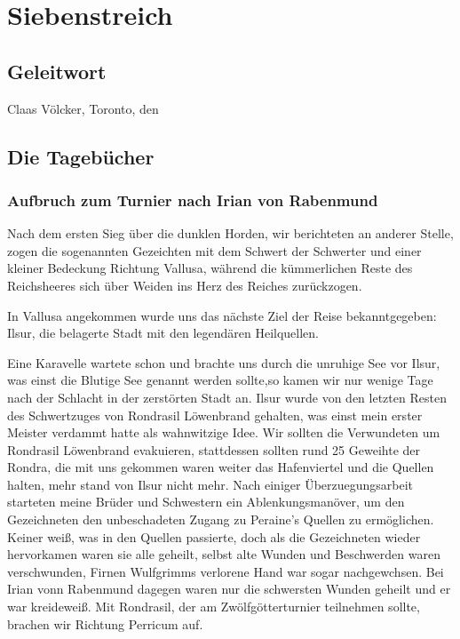 \chapter{Siebenstreich}

\section{Geleitwort}

\begin{flushright}
Claas Völcker, Toronto, den 
\end{flushright}

\section{Die Tagebücher}

\subsection{Aufbruch zum Turnier nach Irian von Rabenmund}

Nach dem ersten Sieg über die dunklen Horden, wir berichteten an anderer Stelle, zogen die sogenannten Gezeichten mit dem Schwert der Schwerter und einer kleiner Bedeckung Richtung Vallusa, während die kümmerlichen Reste des Reichsheeres sich über Weiden ins Herz des Reiches zurückzogen.

In Vallusa angekommen wurde uns das nächste Ziel der Reise bekanntgegeben: Ilsur, die belagerte Stadt mit den legendären Heilquellen.

Eine Karavelle wartete schon und brachte uns durch die unruhige See vor Ilsur, was einst die Blutige See genannt werden sollte,so kamen wir nur wenige Tage nach der Schlacht in der zerstörten Stadt an. Ilsur wurde von den letzten Resten des Schwertzuges von Rondrasil Löwenbrand gehalten, was einst mein erster Meister verdammt hatte als wahnwitzige Idee. Wir sollten die Verwundeten um Rondrasil Löwenbrand evakuieren, stattdessen sollten rund 25 Geweihte der Rondra, die mit uns gekommen waren weiter das Hafenviertel und die Quellen halten, mehr stand von Ilsur nicht mehr. Nach einiger Überzuegungsarbeit starteten meine Brüder und Schwestern ein Ablenkungsmanöver, um den Gezeichneten den unbeschadeten Zugang zu Peraine's Quellen zu ermöglichen. Keiner weiß, was in den Quellen passierte, doch als die Gezeichneten wieder hervorkamen waren sie alle geheilt, selbst alte Wunden und Beschwerden waren verschwunden, Firnen Wulfgrimms verlorene Hand war sogar nachgewchsen. Bei Irian vonn Rabenmund dagegen waren nur die schwersten Wunden geheilt und er war kreideweiß. Mit Rondrasil, der am Zwölfgötterturnier teilnehmen sollte, brachen wir Richtung Perricum auf.

